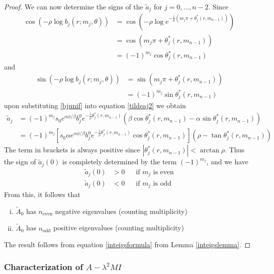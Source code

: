 \documentclass[thesis.tex]{subfiles}
\begin{document}
\begin{lemma}
\begin{proof}
We can now determine the signs of the $\tilde{a}_j$ for $j = 0, \dots, n-2$. Since
\begin{align*}
\cos\left( -\rho \log b_j(r; m_j, \theta) \right) 
&= \cos\left( -\rho \log e^{ -\frac{1}{\rho}(m_j \pi + \theta^*_j(r, m_{n-1})) } \right) \\
&= \cos\left( m_j \pi + \theta^*_j(r, m_{n-1})\right) \\
&= (-1)^{m_j} \cos \theta^*_j(r, m_{n-1})
\end{align*}
and
\begin{align*}
\sin\left( -\rho \log b_j(r; m_j, \theta) \right) 
&= \sin\left( m_j \pi + \theta^*_j(r, m_{n-1})\right) \\
&= (-1)^{m_j} \sin \theta^*_j(r, m_{n-1})
\end{align*}
upon substituting \eqref{bjunif} into equation \eqref{tildeaj2} we obtain
\begin{align*}
\tilde{a}_j 
&= (-1)^{m_j} s_0 e^{\alpha \phi/\beta} b_j^0 e^{ -\frac{1}{\rho} \theta^*_j(r, m_{n-1}) } \left( \beta \cos\theta^*_j(r, m_{n-1}) - \alpha \sin \theta^*_j(r, m_{n-1}) \right) \\
&= (-1)^{m_j} \left[ s_0 \alpha e^{\alpha \phi/\beta} b_j^0 e^{ -\frac{1}{\rho} \theta^*_j(r, m_{n-1}) } \cos\theta^*_j(r, m_{n-1}) \right] \left( \rho - \tan \theta^*_j(r, m_{n-1}) \right)
\end{align*}
The term in brackets is always positive since $|\theta^*_j(r, m_{n-1})| < \arctan \rho$. Thus the sign of $\tilde{a}_j(0)$ is completely determined by the term $(-1)^{m_j}$, and we have
\begin{align*}
\tilde{a}_j(0) &> 0 && \text{if } m_j \text{ is even} \\
\tilde{a}_j(0) &< 0 && \text{if } m_j \text{ is odd}
\end{align*}
From this, it follows that 
\begin{enumerate}[(i)]
\item $\tilde{A}_0$ has $n_{\text{even}}$ negative eigenvalues (counting multiplicity)
\item $\tilde{A}_0$ has $n_{\text{odd}}$ positive eigenvalues (counting multiplicity)
\end{enumerate}
The result follows from equation \eqref{inteigsformula} from Lemma \ref{inteigslemma}.
\end{proof}
\end{lemma}

\subsubsection{Characterization of \texorpdfstring{$A - \lambda^2 MI$}{Matrix A} }
\end{document}
